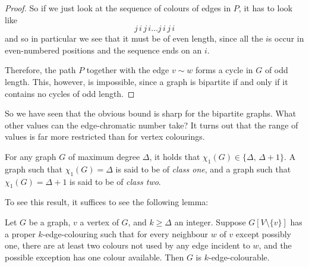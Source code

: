 \documentclass[nobib]{tufte-handout}
\begin{document}
\begin{theorem}
\begin{proof}
        So if we just look at the sequence of colours of edges in $P$, it has to look like
        $$j\,i\,j\,i\ldots j\,i\,j\,i$$
        and so in particular we see that it must be of even length, since all the $i$s occur in even-numbered positions and the sequence ends on an $i$.

        Therefore, the path $P$ together with the edge $v \sim w$ forms a cycle in $G$ of odd length. This, however, is impossible, since a graph is bipartite if and only if it contains no cycles of odd length.
    \end{proof}
\end{theorem}

So we have seen that the obvious bound is sharp for the bipartite graphs. What other values can the edge-chromatic number take? It turns out that the range of values is far more restricted than for vertex colourings.

\begin{theorem}[Vizing, 1964]\label{thm:vizing}
  For any graph $G$ of maximum degree $\Delta$, it holds that $\chi_1(G) \in \{\Delta,\, \Delta+1\}$. A graph such that $\chi_1(G) = \Delta$ is said to be of \emph{class one}, and a graph such that $\chi_1(G) = \Delta + 1$ is said to be of \emph{class two}.
\end{theorem}

To see this result, it suffices to see the following lemma:

\begin{lemma}\label{lemma:vizing_thm_lemma}
  Let $G$ be a graph, $v$ a vertex of $G$, and $k \geq \Delta$ an integer. Suppose $G[V\setminus\{v\}]$ has a proper $k$-edge-colouring such that for every neighbour $w$ of $v$ except possibly one, there are at least two colours not used by any edge incident to $w$, and the possible exception has one colour available. Then $G$ is $k$-edge-colourable.
\end{lemma}
\end{document}
